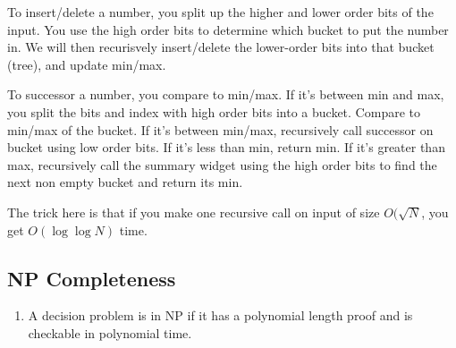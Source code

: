 \documentclass[12pt,twocolumn]{article}
\begin{document}
To insert/delete a number, you split up the higher and lower order bits of the input. You use the high order bits to determine which bucket to put the number in. We will then recurisvely insert/delete the lower-order bits into that bucket (tree), and update min/max.

To successor a number, you compare to min/max. If it's between min and max, you split the bits and index with high order bits into a bucket. Compare to min/max of the bucket. If it's between min/max, recursively call successor on bucket using low order bits. If it's less than min, return min. If it's greater than max, recursively call the summary widget using the high order bits to find the next non empty bucket and return its min.

The trick here is that if you make one recursive call on input of size $O(\sqrt{N}$, you get $O(\log \log N)$ time.

\subsection{NP Completeness}
\begin{enumerate}
    \item A decision problem is in NP if it has a polynomial length proof and is checkable in polynomial time.
\end{enumerate}
\end{document}
